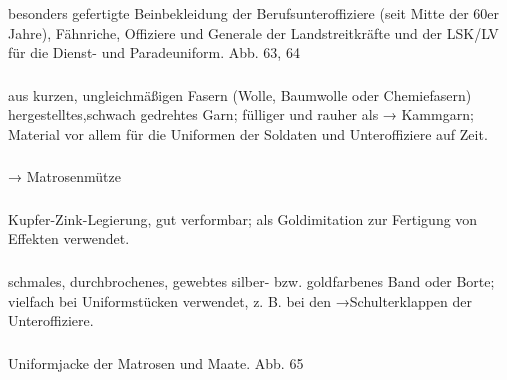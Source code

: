 \subsubsection*{}%

besonders gefertigte Beinbekleidung der Berufsunteroffiziere (seit Mitte der 60er Jahre), Fähnriche, Offiziere und Generale der Landstreitkräfte und der LSK/LV für die Dienst- und Paradeuniform. Abb. 63, 64

\subsubsection*{}%

aus kurzen, ungleichmäßigen Fasern (Wolle, Baumwolle
oder Chemiefasern) hergestelltes,schwach gedrehtes
Garn; fülliger und rauher als → Kammgarn; Material vor
allem für die Uniformen der Soldaten und Unteroffiziere
auf Zeit.

\subsubsection*{}%

→ Matrosenmütze

\subsubsection*{}%

Kupfer-Zink-Legierung, gut verformbar; als Goldimitation zur Fertigung von Effekten verwendet.

\subsubsection*{}%

schmales, durchbrochenes, gewebtes silber- bzw. goldfarbenes Band oder Borte; vielfach bei Uniformstücken verwendet, z. B. bei den →Schulterklappen der Unteroffiziere.

\subsubsection*{}%

Uniformjacke der Matrosen und Maate. Abb. 65

\subsubsection*{}%

